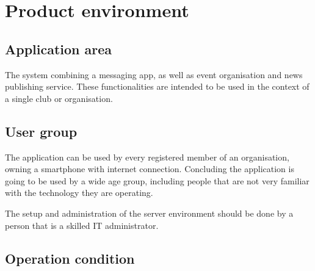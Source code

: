\chapter{Product environment}
\section{Application area}
The system combining a messaging app, as well as event organisation and news publishing service. These functionalities are intended to be used in the context of a single club or organisation.

\section{User group}
The application can be used by every registered member of an organisation, owning a smartphone with internet connection. Concluding the application is going to be used by a wide age group, including people that are not very familiar with the technology they are operating.

The setup and administration of the server environment should be done by a person that is a skilled IT administrator.

\section{Operation condition}





